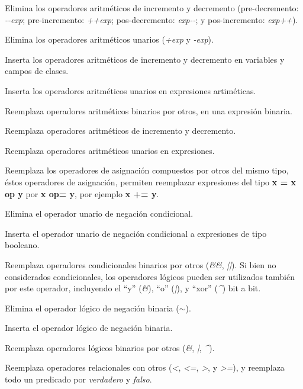 \begin{description}[leftmargin=8em,style=nextline]
	\item[AODS] Elimina los operadores aritm\'eticos de incremento y decremento (pre-decremento: \emph{-{}-exp}; pre-incremento: \emph{++exp}; pos-decremento: \emph{exp-{}-}; y pos-incremento: \emph{exp++}).
	\item[AODU] Elimina los operadores aritm\'eticos unarios (\emph{+exp} y \emph{-exp}).
	\item[AOIS] Inserta los operadores aritm\'eticos de incremento y decremento en variables y campos de clases.
	\item[AOIU] Inserta los operadores aritm\'eticos unarios en expresiones artim\'eticas.
	\item[AORB] Reemplaza operadores aritm\'eticos binarios por otros, en una expresi\'on binaria.
	\item[AORS] Reemplaza operadores aritm\'eticos de incremento y decremento.
	\item[AORU] Reemplaza operadores aritm\'eticos unarios en expresiones.
	\item[ASRS] Reemplaza los operadores de asignaci\'on compuestos por otros del mismo tipo, \'estos operadores de asignaci\'on, permiten reemplazar expresiones del tipo \textbf{x = x op y} por \textbf{x op= y}, por ejemplo \textbf{x += y}.
	\item[COD] Elimina el operador unario de negaci\'on condicional.
	\item[COI] Inserta el operador unario de negaci\'on condicional a expresiones de tipo booleano.
	\item[COR] Reemplaza operadores condicionales binarios por otros (\emph{\&\&}, \emph{||}). Si bien no considerados condicionales, los operadores l\'ogicos pueden ser utilizados tambi\'en por este operador, incluyendo el ``y'' (\emph{\&}), ``o'' (\emph{|}), y ``xor'' (\emph{\^}) bit a bit.
	\item[LOD] Elimina el operador l\'ogico de negaci\'on binaria (\emph{$\sim$}).
	\item[LOI] Inserta el operador l\'ogico de negaci\'on binaria.
	\item[LOR] Reemplaza operadores l\'ogicos binarios por otros (\emph{\&}, \emph{|}, \emph{\^}).
	\item[ROR] Reemplaza operadores relacionales con otros (\emph{<}, \emph{<=}, \emph{>}, y \emph{>=}), y reemplaza todo un predicado por \emph{verdadero} y \emph{falso}.
\end{description}

